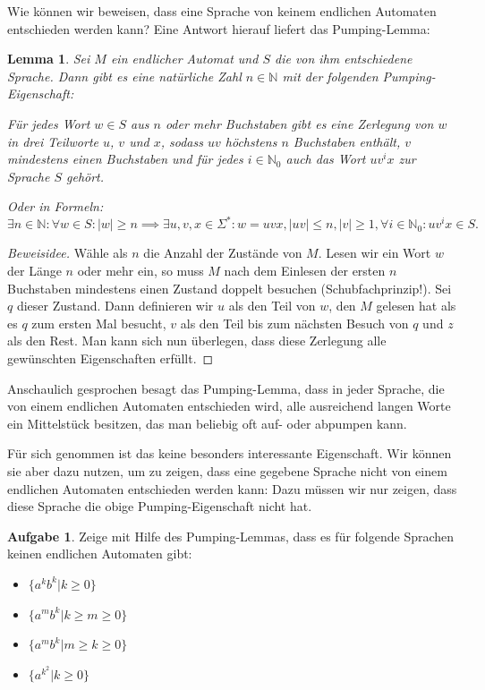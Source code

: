 \documentclass[a4paper,ngerman,12pt]{scrartcl}
\newcommand{\IN}{\mathbb{N}}
\newcommand{\INo}{\mathbb{N}_0}
\newcommand{\abs}[1]{\left|#1\right|}
\theoremstyle{definition}
\newtheorem{aufg}{Aufgabe}
\theoremstyle{plain}
\newtheorem{lemma}[defn]{Lemma}
\theoremstyle{remark}
\begin{document}
Wie können wir beweisen, dass eine Sprache von keinem endlichen Automaten entschieden werden kann? Eine Antwort hierauf liefert das Pumping-Lemma:

\begin{lemma}
	Sei $M$ ein endlicher Automat und $S$ die von ihm entschiedene Sprache. Dann gibt es eine natürliche Zahl $n \in \IN$ mit der folgenden Pumping-Eigenschaft:
	
	Für jedes Wort $w \in S$ aus $n$ oder mehr Buchstaben gibt es eine Zerlegung von $w$ in drei Teilworte $u$, $v$ und $x$, sodass $uv$ höchstens $n$ Buchstaben enthält, $v$ mindestens einen Buchstaben und für jedes $i \in \INo$ auch das Wort $uv^ix$ zur Sprache $S$ gehört. 
	
	Oder in Formeln:
		\[\exists n \in \IN: \forall w \in S: \abs{w} \geq n \implies \exists u,v,x \in \Sigma^*: w=uvx, \abs{uv} \leq n, \abs{v} \geq 1, \forall i \in \INo: uv^ix \in S.\]
\end{lemma}

\begin{proof}[Beweisidee]
	Wähle als $n$ die Anzahl der Zustände von $M$. Lesen wir ein Wort $w$ der Länge $n$ oder mehr ein, so muss $M$ nach dem Einlesen der ersten $n$ Buchstaben mindestens einen Zustand doppelt besuchen (Schubfachprinzip!). Sei $q$ dieser Zustand. Dann definieren wir $u$ als den Teil von $w$, den $M$ gelesen hat als es $q$ zum ersten Mal besucht, $v$ als den Teil bis zum nächsten Besuch von $q$ und $z$ als den Rest. Man kann sich nun überlegen, dass diese Zerlegung alle gewünschten Eigenschaften erfüllt.
\end{proof}

Anschaulich gesprochen besagt das Pumping-Lemma, dass in jeder Sprache, die von einem endlichen Automaten entschieden wird, alle ausreichend langen Worte ein Mittelstück besitzen, das man beliebig oft auf- oder abpumpen kann.

Für sich genommen ist das keine besonders interessante Eigenschaft. Wir können sie aber dazu nutzen, um zu zeigen, dass eine gegebene Sprache nicht von einem endlichen Automaten entschieden werden kann: Dazu müssen wir nur zeigen, dass diese Sprache die obige Pumping-Eigenschaft nicht hat.

\begin{aufg}
	Zeige mit Hilfe des Pumping-Lemmas, dass es für folgende Sprachen keinen endlichen Automaten gibt:
	\begin{itemize}
		\item $\{a^kb^k | k \geq 0 \}$
		\item $\{a^mb^k | k \geq m \geq 0 \}$
		\item $\{a^mb^k | m \geq k \geq 0 \}$
		\item $\{a^{k^2} | k \geq 0 \}$
	\end{itemize}
\end{aufg}
\end{document}
